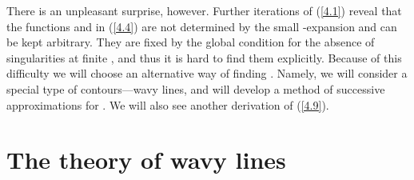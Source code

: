 \documentclass[a4paper,12pt]{article}
\numberwithin{equation}{section}
\begin{document}
There is an unpleasant surprise, however. Further iterations of (\ref{4.1})
reveal that the functions \coordHE{} and \coordHE{} in (\ref{4.4})
are not determined by the small \myHighlight{\( \tau  \)}\coordHE{}-expansion and can be kept arbitrary.
They are fixed by the global condition for the absence of singularities at finite
\myHighlight{\( \tau  \)}\coordHE{}, and thus it is hard to find them explicitly. Because of this difficulty
we will choose an alternative way of finding \coordHE{}. Namely,
we will consider a special type of contours---wavy lines, and will develop a
method of successive approximations for \coordHE{}. We will also
see another derivation of (\ref{4.9}). 


\section{The theory of wavy lines}
\end{document}
